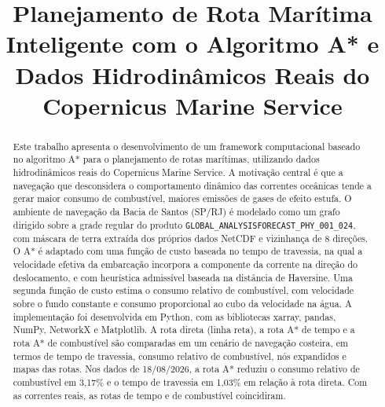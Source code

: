 \documentclass[conference]{IEEEtran}
\newcommand{\prodname}{\texttt{GLOBAL\_ANALYSISFORECAST\_PHY\_}\allowbreak\texttt{001\_024}}
\begin{document}
\title{Planejamento de Rota Marítima Inteligente com o Algoritmo A* e Dados Hidrodinâmicos Reais do Copernicus Marine Service}

\author{
\and
{}
\and
{}
}

\maketitle

\begin{abstract}
Este trabalho apresenta o desenvolvimento de um framework computacional baseado no algoritmo A* para o planejamento de rotas marítimas, utilizando dados hidrodinâmicos reais do Copernicus Marine Service. A motivação central é que a navegação que desconsidera o comportamento dinâmico das correntes oceânicas tende a gerar maior consumo de combustível, maiores emissões de gases de efeito estufa. O ambiente de navegação da Bacia de Santos (SP/RJ) é modelado como um grafo dirigido sobre a grade regular do produto \prodname, com máscara de terra extraída dos próprios dados NetCDF e vizinhança de 8 direções. O A* é adaptado com uma função de custo baseada no tempo de travessia, na qual a velocidade efetiva da embarcação incorpora a componente da corrente na direção do deslocamento, e com heurística admissível baseada na distância de Haversine. Uma segunda função de custo estima o consumo relativo de combustível, com velocidade sobre o fundo constante e consumo proporcional ao cubo da velocidade na água. A implementação foi desenvolvida em Python, com as bibliotecas xarray, pandas, NumPy, NetworkX e Matplotlib. A rota direta (linha reta), a rota A* de tempo e a rota A* de combustível são comparadas em um cenário de navegação costeira, em termos de tempo de travessia, consumo relativo de combustível, nós expandidos e mapas das rotas. Nos dados de 18/08/2026, a rota A* reduziu o consumo relativo de combustível em 3,17\% e o tempo de travessia em 1,03\% em relação à rota direta. Com as correntes reais, as rotas de tempo e de combustível coincidiram.
\end{abstract}
\end{document}

